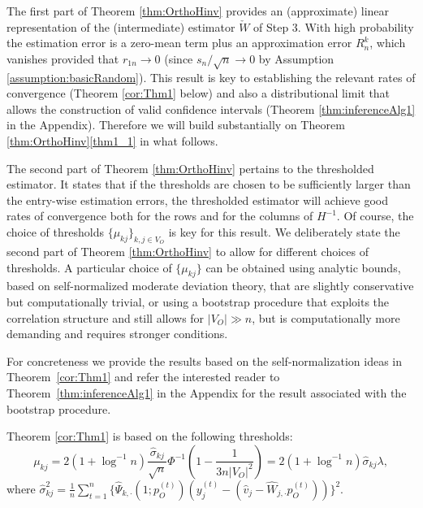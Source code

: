 \documentclass[opre,nonblindrev]{informs3} %
\begin{document}
The first part of Theorem \ref{thm:OrthoHinv}  provides an (approximate) linear representation of the (intermediate) estimator $\check W$ of Step 3. With high probability the estimation error is a zero-mean term plus an approximation error $R^k_n$, which vanishes 
provided that $r_{1n}\rightarrow 0$ (since  $s_n/\sqrt{n}\rightarrow 0$ by Assumption \ref{assumption:basicRandom}).
This result is key to establishing the relevant rates of convergence (Theorem \ref{cor:Thm1} below) and also a distributional limit that allows the construction of valid confidence intervals (Theorem \ref{thm:inferenceAlg1} in the Appendix). Therefore we will build substantially on Theorem \ref{thm:OrthoHinv}\ref{thm1_1} in what follows.

{The second part of  Theorem \ref{thm:OrthoHinv} pertains to the thresholded estimator. It states that if the thresholds are chosen to 
be sufficiently larger than the entry-wise estimation errors,
	the thresholded estimator will achieve good rates of convergence both for the rows and for the columns of $H^{-1}$. Of course, the choice of thresholds $\{\mu_{kj}\}_{ k,j\in V_O}$ is key for this result. 
	We deliberately state the second part of  Theorem \ref{thm:OrthoHinv} to allow for different choices of thresholds. A particular choice of $\{\mu_{kj}\}$ can be obtained using analytic bounds, based on self-normalized moderate deviation theory, that are slightly conservative but computationally trivial, or using a bootstrap procedure that exploits the correlation structure 
	and still allows for $|V_O|\gg n$,
	but  is computationally more demanding and requires stronger conditions. 
	
	For concreteness we provide the results based on the self-normalization ideas in Theorem~\ref{cor:Thm1} and refer the interested reader to Theorem~\ref{thm:inferenceAlg1} in the Appendix for the result associated with the bootstrap procedure.}
Theorem \ref{cor:Thm1} is based on the following thresholds:
	\begin{equation}\label{eq:thresholds}
	\mu_{kj} = 2 (1+\log^{-1}n)
	\frac{\hat\sigma_{kj}}{\sqrt{n}}  \Phi^{-1}\left(1-\frac{1}{3n|V_O|^2}\right)
	= 2(1+\log^{-1}n) \hat\sigma_{kj}\lambda,
	\end{equation}%
where $\hat\sigma_{kj}^2 = \frac{1}{n}\sum_{t=1}^n\{\hat\Psi_{k,\cdot}(1;p_O^{(t)})(y_j^{(t)}-(\hat v_j-\hat W_{j,\cdot}p_O^{(t)}))\}^2$.
\end{document}
